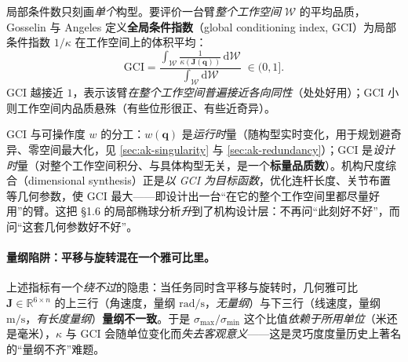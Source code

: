 \begin{theorem}\label{thm:ak-gci}
局部条件数只刻画\emph{单个}构型。要评价一台臂\emph{整个工作空间} $\mathcal{W}$ 的平均品质，Gosselin 与 Angeles 定义\textbf{全局条件指数}（global conditioning index, GCI）为局部条件指数 $1/\kappa$ 在工作空间上的体积平均\cite{angeles2014fundamentals,gosselin1990singularity}：
\begin{equation}
  \boxed{\mathrm{GCI}=\frac{\displaystyle\int_{\mathcal{W}}\frac{1}{\kappa(\mathbf{J}(\mathbf{q}))}\,\mathrm{d}\mathcal{W}}{\displaystyle\int_{\mathcal{W}}\mathrm{d}\mathcal{W}}\;\in(0,1].}
  \label{eq:ak-gci}
\end{equation}
$\mathrm{GCI}$ 越接近 $1$，表示该臂\emph{在整个工作空间普遍接近各向同性}（处处好用）；GCI 小则工作空间内品质悬殊（有些位形很正、有些近奇异）。
\end{theorem}

\begin{insight}\label{ins:ak-gci-design}
GCI 与可操作度 $w$ 的分工\cite{angeles2014fundamentals}：$w(\mathbf{q})$ 是\emph{运行时}量（随构型实时变化，用于规划避奇异、零空间最大化，见 \cref{sec:ak-singularity} 与 \cref{sec:ak-redundancy}）；GCI 是\emph{设计时}量（对整个工作空间积分、与具体构型无关，是一个\textbf{标量品质数}）。机构尺度综合（dimensional synthesis）正是\emph{以 GCI 为目标函数}，优化连杆长度、关节布置等几何参数，使 GCI 最大——即设计出一台“在它的整个工作空间里都尽量好用”的臂。这把 §1.6 的局部椭球分析\emph{升}到了机构设计层：不再问“此刻好不好”，而问“这套几何参数好不好”。
\end{insight}

\paragraph{量纲陷阱：平移与旋转混在一个雅可比里。}
上述指标有一个\emph{绕不过}的隐患：当任务同时含平移与旋转时，几何雅可比 $\mathbf{J}\in\mathbb{R}^{6\times n}$ 的上三行（角速度，量纲 $\mathrm{rad/s}$，\emph{无量纲}）与下三行（线速度，量纲 $\mathrm{m/s}$，\emph{有长度量纲}）\textbf{量纲不一致}。于是 $\sigma_{\max}/\sigma_{\min}$ 这个比值\emph{依赖于所用单位}（米还是毫米），$\kappa$ 与 GCI 会随单位变化而\emph{失去客观意义}——这是灵巧度度量历史上著名的“量纲不齐”难题\cite{angeles2014fundamentals}。

